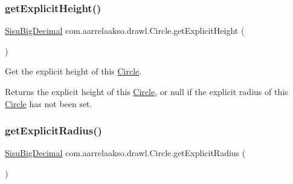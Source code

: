 \mbox{\label{classcom_1_1aarrelaakso_1_1drawl_1_1_circle_a31a2fa475820117ecfbb5c9cd839f0f4}} 
\subsubsection{\texorpdfstring{get\+Explicit\+Height()}{getExplicitHeight()}}
{\footnotesize\ttfamily \hyperlink{classcom_1_1aarrelaakso_1_1drawl_1_1_sisu_big_decimal}{Sisu\+Big\+Decimal} com.\+aarrelaakso.\+drawl.\+Circle.\+get\+Explicit\+Height (\begin{DoxyParamCaption}{ }\end{DoxyParamCaption})}

Get the explicit height of this \hyperlink{classcom_1_1aarrelaakso_1_1drawl_1_1_circle}{Circle}.

\begin{DoxyReturn}{Returns}
the explicit height of this \hyperlink{classcom_1_1aarrelaakso_1_1drawl_1_1_circle}{Circle}, or {\ttfamily null} if the explicit radius of this \hyperlink{classcom_1_1aarrelaakso_1_1drawl_1_1_circle}{Circle} has not been set. 
\end{DoxyReturn}
\mbox{\label{classcom_1_1aarrelaakso_1_1drawl_1_1_circle_a1fd7180d686a72b1631a51f0c34f5690}} 
\subsubsection{\texorpdfstring{get\+Explicit\+Radius()}{getExplicitRadius()}}
{\footnotesize\ttfamily \hyperlink{classcom_1_1aarrelaakso_1_1drawl_1_1_sisu_big_decimal}{Sisu\+Big\+Decimal} com.\+aarrelaakso.\+drawl.\+Circle.\+get\+Explicit\+Radius (\begin{DoxyParamCaption}{ }\end{DoxyParamCaption})\hspace{0.3cm}{\ttfamily [protected]}}

